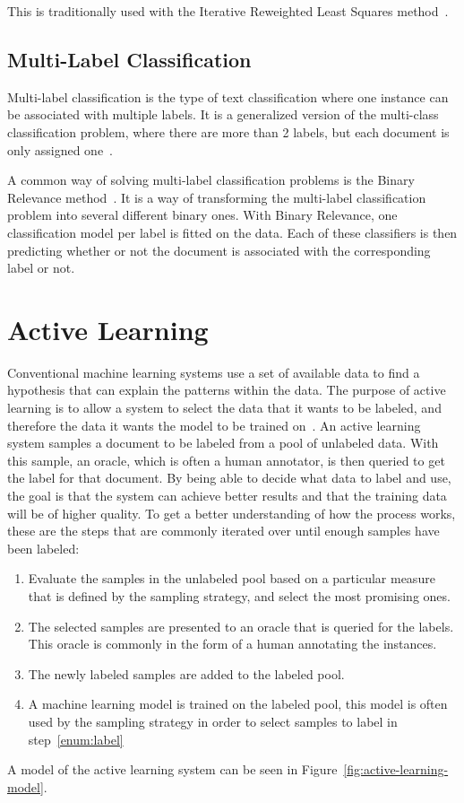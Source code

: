 This is traditionally used with the Iterative Reweighted Least Squares method~\cite{bishop2006pattern}.

\subsection{Multi-Label Classification}\label{subsec:multi-label-classification}

Multi-label classification is the type of text classification where one instance can be associated with multiple labels.
It is a generalized version of the multi-class classification problem, where there are more than 2 labels, but each document is only assigned one~\cite{tsoumakas2006multi}.

A common way of solving multi-label classification problems is the Binary Relevance method~\cite{read2011classifier, boutell2004learning, luaces2012binary}.
It is a way of transforming the multi-label classification problem into several different binary ones.
With Binary Relevance, one classification model per label is fitted on the data.
Each of these classifiers is then predicting whether or not the document is associated with the corresponding label or not.

\section{Active Learning}\label{sec:active-learning}

Conventional machine learning systems use a set of available data to find a hypothesis that can explain the patterns within the data.
The purpose of active learning is to allow a system to select the data that it wants to be labeled, and therefore the data it wants the model to be trained on~\cite{settles2012active}.
An active learning system samples a document to be labeled from a pool of unlabeled data.
With this sample, an oracle, which is often a human annotator, is then queried to get the label for that document.
By being able to decide what data to label and use, the goal is that the system can achieve better results and that the training data will be of higher quality.
To get a better understanding of how the process works, these are the steps that are commonly iterated over until enough samples have been labeled:
\begin{enumerate}
    \item Evaluate the samples in the unlabeled pool based on a particular measure that is defined by the sampling strategy, and select the most promising ones.
    \item The selected samples are presented to an oracle that is queried for the labels. This oracle is commonly in the form of a human annotating the instances. \label{enum:label}
    \item The newly labeled samples are added to the labeled pool.
    \item A machine learning model is trained on the labeled pool, this model is often used by the sampling strategy in order to select samples to label in step~\ref{enum:label}
\end{enumerate}
A model of the active learning system can be seen in Figure~\ref{fig:active-learning-model}.

